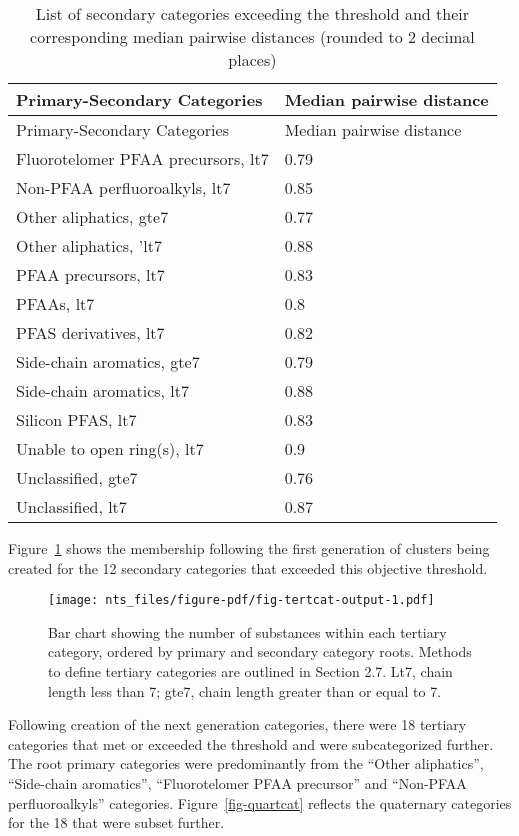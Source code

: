 \documentclass[
  super,
  preprint,
  3p]{elsarticle}
\begin{document}
\hypertarget{tbl-require-cat}{}
\begin{longtable}[]{@{}ll@{}}
\caption{\label{tbl-require-cat}List of secondary categories exceeding
the threshold and their corresponding median pairwise distances (rounded
to 2 decimal places)}\tabularnewline
\toprule\noalign{}
Primary-Secondary Categories & Median pairwise distance \\
\midrule\noalign{}
\endfirsthead
\toprule\noalign{}
Primary-Secondary Categories & Median pairwise distance \\
\midrule\noalign{}
\endhead
\bottomrule\noalign{}
\endlastfoot
Fluorotelomer PFAA precursors, lt7 & 0.79 \\
Non-PFAA perfluoroalkyls, lt7 & 0.85 \\
Other aliphatics, gte7 & 0.77 \\
Other aliphatics, 'lt7 & 0.88 \\
PFAA precursors, lt7 & 0.83 \\
PFAAs, lt7 & 0.8 \\
PFAS derivatives, lt7 & 0.82 \\
‍Side-chain aromatics, gte7 & 0.79 \\
‍Side-chain aromatics, lt7 & 0.88 \\
‍Silicon PFAS, lt7 & 0.83 \\
‍Unable to open ring(s), lt7 & 0.9 \\
Unclassified, gte7 & 0.76 \\
‍Unclassified, lt7 & 0.87 \\
\end{longtable}

Figure~\ref{fig-tertcat} shows the membership following the first
generation of clusters being created for the 12 secondary categories
that exceeded this objective threshold.

\begin{figure}

{\centering \texttt{[image: nts\_files/figure-pdf/fig-tertcat-output-1.pdf]}

}

\caption{\label{fig-tertcat}Bar chart showing the number of substances
within each tertiary category, ordered by primary and secondary category
roots. Methods to define tertiary categories are outlined in Section
2.7. Lt7, chain length less than 7; gte7, chain length greater than or
equal to 7.}

\end{figure}

Following creation of the next generation categories, there were 18
tertiary categories that met or exceeded the threshold and were
subcategorized further. The root primary categories were predominantly
from the ``Other aliphatics'', ``Side-chain aromatics'', ``Fluorotelomer
PFAA precursor'' and ``Non-PFAA perfluoroalkyls'' categories.
Figure~\ref{fig-quartcat} reflects the quaternary categories for the 18
that were subset further.
\end{document}
